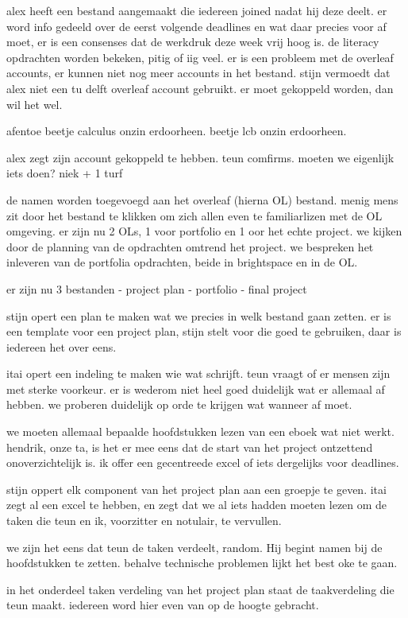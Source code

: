 alex heeft een bestand aangemaakt die iedereen joined nadat hij deze deelt.
er word info gedeeld over de eerst volgende deadlines en wat daar precies voor af moet,
 er is een consenses dat de werkdruk deze week vrij hoog is.
de literacy opdrachten worden bekeken, pitig of iig veel.
er is een probleem met de overleaf accounts, er kunnen niet nog meer accounts in het bestand.
stijn vermoedt dat alex niet een tu delft overleaf account gebruikt.
er moet gekoppeld worden, dan wil het wel.

afentoe beetje calculus onzin erdoorheen.
beetje lcb onzin erdoorheen.

alex zegt zijn account gekoppeld te hebben.
teun comfirms.
moeten we eigenlijk iets doen? niek + 1 turf

de namen worden toegevoegd aan het overleaf (hierna OL) bestand.
menig mens zit door het bestand te klikken om zich allen even te familiarlizen met de OL omgeving.
er zijn nu 2 OLs, 1 voor portfolio en 1 oor het echte project.
we kijken door de planning van de opdrachten omtrend het project.
we bespreken het inleveren van de portfolia opdrachten, beide in brightspace en in de OL.

er zijn nu 3 bestanden
 - project plan
 - portfolio
 - final project

stijn opert een plan te maken wat we precies in welk bestand gaan zetten.
er is een template voor een project plan, stijn stelt voor die goed te gebruiken, daar is iedereen het over eens.

itai opert een indeling te maken wie wat schrijft.
teun vraagt of er mensen zijn met sterke voorkeur.
er is wederom niet heel goed duidelijk wat er allemaal af hebben. 
we proberen duidelijk op orde te krijgen wat wanneer af moet.

we moeten allemaal bepaalde hoofdstukken lezen van een eboek wat niet werkt. 
hendrik, onze ta, is het er mee eens dat de start van het project ontzettend onoverzichtelijk is. 
ik offer een gecentreede excel of iets dergelijks voor deadlines.

stijn oppert elk component van het project plan aan een groepje te geven.
itai zegt al een excel te hebben, en zegt dat we al iets hadden moeten lezen om de taken die teun en ik,
voorzitter en notulair, te vervullen.

we zijn het eens dat teun de taken verdeelt, random. Hij begint namen bij de hoofdstukken te zetten. 
behalve technische problemen lijkt het best oke te gaan.

in het onderdeel taken verdeling van het project plan staat de taakverdeling die teun maakt.
iedereen word hier even van op de hoogte gebracht.

